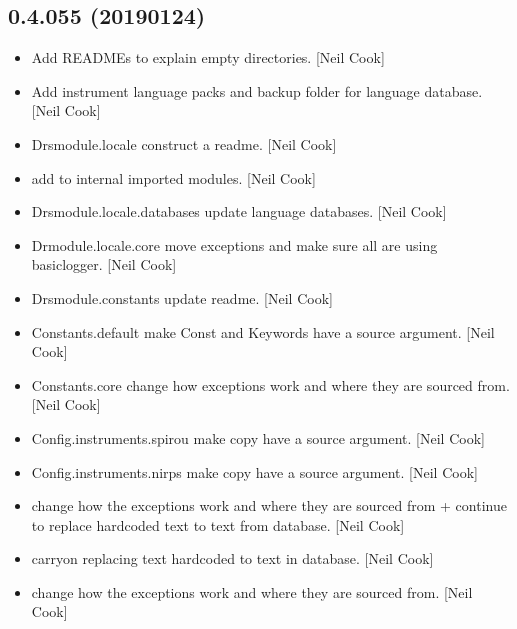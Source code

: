 \documentclass[a4paper,10pt,english]{report}
\begin{document}
\subsection{0.4.055 (2019\sphinxhyphen{}01\sphinxhyphen{}24)}
\label{\detokenize{misc/changelog:id227}}\begin{itemize}
\item {} 
Add READMEs to explain empty directories. {[}Neil Cook{]}

\item {} 
Add instrument language packs and backup folder for language database.
{[}Neil Cook{]}

\item {} 
Drsmodule.locale \sphinxhyphen{} construct a readme. {[}Neil Cook{]}

\item {} 
 \sphinxhyphen{} add  to internal imported
modules. {[}Neil Cook{]}

\item {} 
Drsmodule.locale.databases \sphinxhyphen{} update language databases. {[}Neil Cook{]}

\item {} 
Drmodule.locale.core \sphinxhyphen{} move exceptions and make sure all are using
basiclogger. {[}Neil Cook{]}

\item {} 
Drsmodule.constants \sphinxhyphen{} update readme. {[}Neil Cook{]}

\item {} 
Constants.default \sphinxhyphen{} make Const and Keywords have a source argument.
{[}Neil Cook{]}

\item {} 
Constants.core \sphinxhyphen{} change how exceptions work and where they are sourced
from. {[}Neil Cook{]}

\item {} 
Config.instruments.spirou \sphinxhyphen{} make copy have a source argument. {[}Neil
Cook{]}

\item {} 
Config.instruments.nirps \sphinxhyphen{} make copy have a source argument. {[}Neil
Cook{]}

\item {} 
 \sphinxhyphen{} change how the exceptions work and where they are
sourced from + continue to replace hard\sphinxhyphen{}coded text to text from
database. {[}Neil Cook{]}

\item {} 
 \sphinxhyphen{} carryon replacing text hard\sphinxhyphen{}coded to text in database.
{[}Neil Cook{]}

\item {} 
 \sphinxhyphen{} change how the exceptions work and where they are sourced
from. {[}Neil Cook{]}

\end{itemize}
\end{document}
